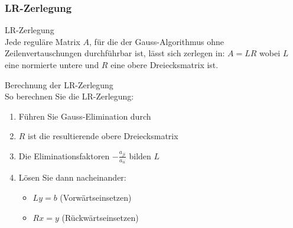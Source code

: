\subsubsection{LR-Zerlegung}

\begin{theorem}{LR-Zerlegung}\\
Jede reguläre Matrix $A$, für die der Gauss-Algorithmus ohne Zeilenvertauschungen durchführbar ist, lässt sich zerlegen in:
$A = LR$
wobei $L$ eine normierte untere und $R$ eine obere Dreiecksmatrix ist.
\end{theorem}

\begin{KR}{Berechnung der LR-Zerlegung}\\
So berechnen Sie die LR-Zerlegung:
\begin{enumerate}
    \item Führen Sie Gauss-Elimination durch
    \item $R$ ist die resultierende obere Dreiecksmatrix
    \item Die Eliminationsfaktoren $-\frac{a_{ji}}{a_{ii}}$ bilden $L$
    \item Lösen Sie dann nacheinander:
        \begin{itemize}
            \item $Ly = b$ (Vorwärtseinsetzen)
            \item $Rx = y$ (Rückwärtseinsetzen)
        \end{itemize}
\end{enumerate}
\end{KR}

